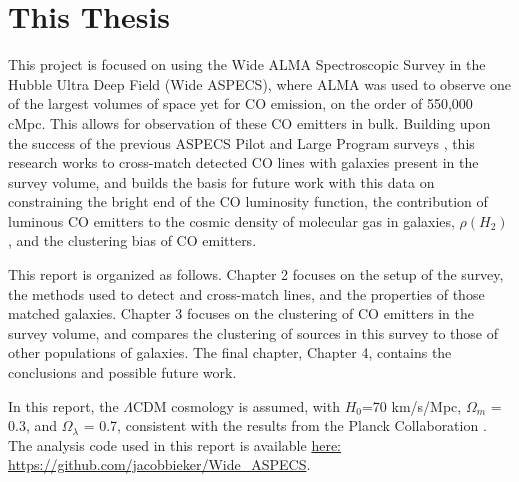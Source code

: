 \documentclass[twoside,single]{lion-msc}
\begin{document}

\section{This Thesis}

This project is focused on using the Wide ALMA Spectroscopic Survey in the Hubble Ultra Deep Field (Wide ASPECS), where ALMA was used to observe one of the largest volumes of space yet for CO emission, on the order of 550,000 cMpc. This allows for observation of these CO emitters in bulk. Building upon the success of the previous ASPECS Pilot and Large Program surveys \cite{walter2016alma, decarli2019alma}, this research works to cross-match detected CO lines with galaxies present in the survey volume, and builds the basis for future work with this data on constraining the bright end of the CO luminosity function, the contribution of luminous CO emitters to the cosmic density of molecular gas in galaxies, $\rho(H_2)$, and the clustering bias of CO emitters.

This report is organized as follows. Chapter 2 focuses on the setup of the survey, the methods used to detect and cross-match lines, and the properties of those matched galaxies. Chapter 3 focuses on the clustering of CO emitters in the survey volume, and compares the clustering of sources in this survey to those of other populations of galaxies. The final chapter, Chapter 4, contains the conclusions and possible future work. 

In this report, the $\Lambda$CDM cosmology is assumed, with $H_0$=70 km/s/Mpc, $\Omega_m$ = 0.3, and $\Omega_{\lambda}$ = 0.7, consistent with the results from the Planck Collaboration \cite{ade2016planck}. The analysis code used in this report is available \href{https://github.com/jacobbieker/Wide\_ASPECS}{here: https://github.com/jacobbieker/Wide\_ASPECS}. 




\end{document}
